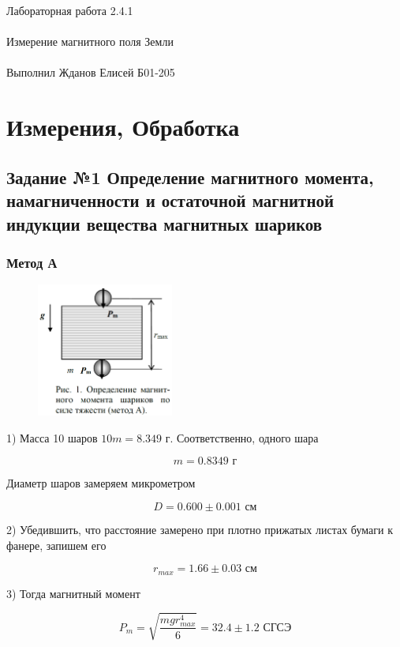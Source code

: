 \documentclass{astroedu-lab}
\begin{document}
\begin{problem}{\huge Лабораторная работа 2.4.1\\\\Измерение магнитного поля Земли\\\\Выполнил Жданов Елисей Б01-205}
\section{Измерения, Обработка}

\subsection{Задание №1 Определение магнитного момента, намагниченности и остаточной магнитной индукции вещества магнитных шариков}

\subsubsection{Метод А}

\begin{figure}[!h]
	\centering
	\includegraphics[width=0.4\textwidth]{1.png}
	\label{fig:boiler}
\end{figure}

1) Масса 10 шаров $10m = 8.349$ г. Соответственно, одного шара

\begin{equation}
	m = 0.8349 \text{ г}
\end{equation}

Диаметр шаров замеряем микрометром

\begin{equation}
	D = 0.600 \pm 0.001 \text{ см}
\end{equation}

2) Убедившить, что расстояние замерено при плотно прижатых листах бумаги к фанере, запишем его

\begin{equation}
	r_{max} = 1.66 \pm 0.03 \text{ см}
\end{equation}

3) Тогда магнитный момент

\begin{equation}
	P_m = \sqrt{\frac{m g r_{max}^4}{6}} = 32.4 \pm 1.2 \text{ СГСЭ}
\end{equation}


\end{problem}
\end{document}
